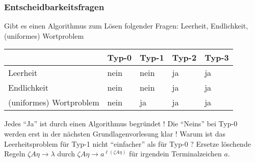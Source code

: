 \documentclass[12pt, a4paper]{article}
\begin{document}
		\subsubsection{Entscheidbarkeitsfragen}
		Gibt es einen Algorithmus zum Lösen folgender Fragen:
		Leerheit, Endlichkeit, (uniformes) Wortproblem
		\begin{center}
			\begin{tabular}{l||l|l|l|l}
				& Typ-0 & Typ-1 & Typ-2 & Typ-3  \\
				\hline
				\hline
				Leerheit				& nein 	& nein 	& ja 	& ja \\
				Endlichkeit				& nein 	& nein 	& ja 	& ja \\
				(uniformes) Wortproblem	& nein 	& ja 	& ja 	& ja \\
			\end{tabular}
		\end{center}
		Jedes “Ja” ist durch einen Algorithmus begründet !
		Die “Neins” bei Typ-0 werden erst in der nächsten Grundlagenvorlesung klar !
		Warum ist das Leerheitsproblem für Typ-1 nicht “einfacher” als für Typ-0 ?
		Ersetze löschende Regeln $\zeta A\eta\rightarrow\lambda$ durch $\zeta A\eta\rightarrow a^{\ell(\zeta A\eta)}$ für irgendein Terminalzeichen $a$.
	

	
\end{document}
